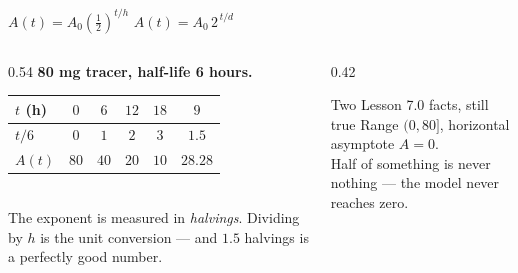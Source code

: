 \documentclass[aspectratio=169, 11pt]{beamer}
\begin{document}
\begin{frame}[t, plain]
  \begin{center}
    \large
    $A(t)=A_{0}\left(\frac12\right)^{t/h}$ \qquad\qquad $A(t)=A_{0}\,2^{\,t/d}$
  \end{center}
  \vspace{6pt}
  \begin{columns}[T]
    \begin{column}{0.54\textwidth}
      \footnotesize
      \textbf{80 mg tracer, half-life 6 hours.}
      \renewcommand{\arraystretch}{1.25}
      \begin{tabular}{|l|c|c|c|c|c|}
      \hline
      $t$ (h) & $0$ & $6$ & $12$ & $18$ & $9$ \\ \hline
      $t/6$ & $0$ & $1$ & $2$ & $3$ & $1.5$ \\ \hline
      $A(t)$ & $80$ & $40$ & $20$ & $10$ & $28.28$ \\ \hline
      \end{tabular}
      \\[6pt]
      {\scriptsize The exponent is measured in \emph{halvings}. Dividing by $h$ is the unit
      conversion --- and $1.5$ halvings is a perfectly good number.}
    \end{column}
    \begin{column}{0.42\textwidth}
      \begin{block}{Two Lesson 7.0 facts, still true}
        \footnotesize Range $(0,80]$, horizontal asymptote $A=0$. \\[3pt]
        Half of something is never nothing --- the model never reaches zero.
      \end{block}
    \end{column}
  \end{columns}
\end{frame}
\end{document}
